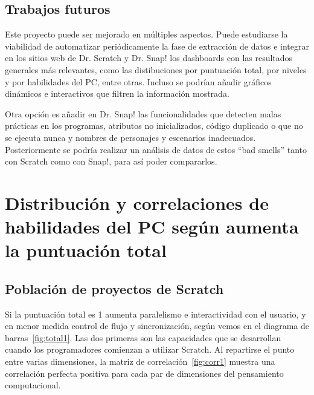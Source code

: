 \documentclass[a4paper, 12pt]{book}
\begin{document}
\section{Trabajos futuros}
\label{sec:trabajos_futuros}

Este proyecto puede ser mejorado en múltiples aspectos. Puede estudiarse la viabilidad de automatizar periódicamente la fase de extracción de datos e integrar en los sitios web de Dr. Scratch y Dr. Snap! los dashboards con las resultados generales más relevantes, como las distibuciones por puntuación total, por niveles y por habilidades del PC, entre otras. Incluso se podrían añadir gráficos dinámicos e interactivos que filtren la información mostrada.

Otra opción es añadir en Dr. Snap! las funcionalidades que detecten malas prácticas en los programas, atributos no inicializados, código duplicado o que no se ejecuta nunca y nombres de personajes y escenarios inadecuados. Posteriormente se podría realizar un análisis de datos de estos ``bad smells'' tanto con Scratch como con Snap!, para así poder compararlos. 



\cleardoublepage
\appendix

\chapter[Distribuciones y correlaciones de habilidades del PC]{Distribución y correlaciones de habilidades del PC según aumenta la puntuación total}

\section{Población de proyectos de Scratch}
\label{append_scratch}

Si la puntuación total es 1 aumenta paralelismo e interactividad con el usuario, y en menor medida control de flujo y sincronización, según vemos en el diagrama de barras~\ref{fig:total1}. Las dos primeras son las capacidades que se desarrollan cuando los programadores comienzan a utilizar  Scratch. Al repartirse el punto entre varias dimensiones,
la matriz de correlación~\ref{fig:corr1} muestra una correlación perfecta positiva para cada par de dimensiones del pensamiento computacional.
\end{document}
